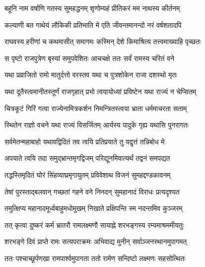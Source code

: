 
\textlink{}
\translink{}

\storymeta


\twolineshloka
{बहूनि नाम वर्षाणि गतस्य सुमहद्धनम्}
{शृणोम्यहं प्रीतिकरं मम नाथस्य कीर्तनम्}

\twolineshloka
{कल्याणी बत गाथेयं लौकिकी प्रतिभाति मे}
{एति जीवन्तमानन्दो नरं वर्षशतादपि}

\twolineshloka
{राघवस्य हरीणां च कथमासीत् समागमः}
{कस्मिन् देशे किमाश्रित्य तत्त्वमाख्याहि पृच्छतः}

\twolineshloka
{स पृष्टो राजपुत्रेण बृस्यां समुपवेशितः}
{आचचक्षे ततः सर्वं रामस्य चरितं वने}

\twolineshloka
{यथा प्रव्राजितो रामो मातुर्दत्तो वरस्तव}
{यथा च पुत्रशोकेन राजा दशस्थो मृतः}

\twolineshloka
{यथा दूतैस्त्वमानीतस्तूर्णं राजगृहात् प्रभो}
{त्वयायोध्यां प्रविष्टेन यथा राज्यं न चेप्सितम्}

\twolineshloka
{चित्रकूटं गिरिं गत्वा राज्येनामित्रकर्शन}
{निमन्त्रितस्त्वया भ्राता धर्ममाचरता सताम्}

\twolineshloka
{स्थितेन राज्ञो वचने यथा राज्यं विसर्जितम्}
{आर्यस्य पादुके गृह्य यथासि पुनरागतः}

\twolineshloka
{सर्वमेतन्महाबाहो यथावद्विदितं तव}
{त्वयि प्रतिप्रयाते तु यद्वृत्तं तन्निबोध मे}


\twolineshloka
{अपयाते त्वयि तदा समुद्भ्रान्तमृगद्विजम्}
{परिद्यूनमिवात्यर्थं तद्वनं समपद्यत}

\twolineshloka
{तद्धस्तिमृदितं घोरं सिंहव्याघ्रमृगायुतम्}
{प्रविवेशाथ विजनं सुमहद्दण्डकावनम्}

\twolineshloka
{तेषां पुरस्ताद्बलवान् गच्छतां गहने वने}
{निनदन् सुमहानादं विराधः प्रत्यदृश्यत}

\twolineshloka
{तमुत्क्षिप्य महानादमूर्ध्वबाहुमधोमुखम्}
{निखाते प्रक्षिपन्ति स्म नदन्तमिव कुञ्जरम्}

\twolineshloka
{तत् कृत्वा दुष्करं कर्म भ्रातरौ रामलक्ष्मणौ}
{सायाह्ने शरभङ्गस्य रम्यमाश्रममीयतुः}

\twolineshloka
{शरभङ्गे दिवं प्राप्ते रामः सत्यपराक्रमः}
{अभिवाद्य मुनीन् सर्वाञ्जनस्थानमुपागमत्}

\twolineshloka
{ततः पश्चाच्छूर्पणखा रामपार्श्वमुपागता}
{ततो रामेण सन्दिष्टो लक्ष्मणः सहसोत्थितः}

